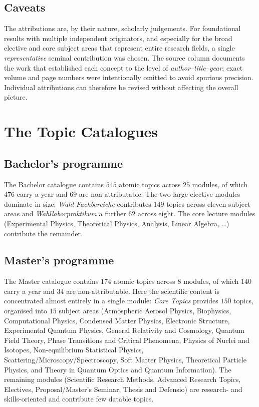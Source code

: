 \documentclass[11pt,a4paper]{article}
\begin{document}
\subsection{Caveats}
The attributions are, by their nature, scholarly judgements. For foundational
results with multiple independent originators, and especially for the broad
elective and core subject areas that represent entire research fields, a single
\emph{representative} seminal contribution was chosen. The source column
documents the work that established each concept to the level of
\emph{author--title--year}; exact volume and page numbers were intentionally
omitted to avoid spurious precision. Individual attributions can therefore be
revised without affecting the overall picture.

\section{The Topic Catalogues}

\subsection{Bachelor's programme}
The Bachelor catalogue contains $545$ atomic topics across $25$ modules, of
which $476$ carry a year and $69$ are non-attributable. The two large elective
modules dominate in size: \textit{Wahl-Fachbereiche} contributes $149$ topics
across eleven subject areas and \textit{Wahllaborpraktikum} a further $62$ across
eight. The core lecture modules (Experimental Physics, Theoretical Physics,
Analysis, Linear Algebra, \dots) contribute the remainder.

\subsection{Master's programme}
The Master catalogue contains $174$ atomic topics across $8$ modules, of which
$140$ carry a year and $34$ are non-attributable. Here the scientific content is
concentrated almost entirely in a single module: \textit{Core Topics} provides
$150$ topics, organised into $15$ subject areas
(Atmospheric Aerosol Physics, Biophysics, Computational Physics, Condensed
Matter Physics, Electronic Structure, Experimental Quantum Physics, General
Relativity and Cosmology, Quantum Field Theory, Phase Transitions and Critical
Phenomena, Physics of Nuclei and Isotopes, Non-equilibrium Statistical Physics,
Scattering/Microscopy/Spectroscopy, Soft Matter Physics, Theoretical Particle
Physics, and Theory in Quantum Optics and Quantum Information). The remaining
modules (Scientific Research Methods, Advanced Research Topics, Electives,
Proposal/Master's Seminar, Thesis and Defensio) are research- and
skills-oriented and contribute few datable topics.
\end{document}
